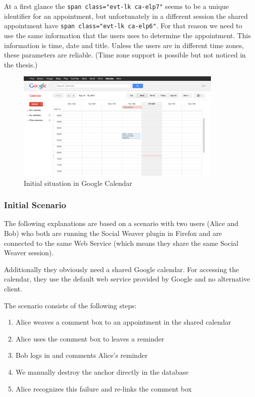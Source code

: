 At a first glance the \verb+span class="evt-lk ca-elp7"+ seems to be a unique identifier for an appointment, but unfortunately in a different session the shared appointment have \verb+span class="evt-lk ca-elp6"+. For that reason we need to use the same information that the users uses to determine the appointment. This information is time, date and title. Unless the users are in different time zones, these parameters are reliable. (Time zone support is possible but not noticed in the thesis.)

\begin{figure}\centering
	\includegraphics[width=10cm]{images/gcal-plain.png}
\caption{Initial situation in Google Calendar}
\label{gcal-plain}
\end{figure}

\subsubsection{Initial Scenario}
The following explanations are based on a scenario with two users (Alice and Bob) who both are running the Social Weaver plugin in Firefox and are connected to the same Web Service (which means they share the same Social Weaver session). 

Additionally they obviously need a shared Google calendar. For accessing the calendar, they use the default web service provided by Google and no alternative client. 

The scenario consists of the following steps:
\begin{enumerate}
	\item Alice weaves a comment box to an appointment in the shared calendar
	\item Alice uses the comment box to leaves a reminder
	\item Bob logs in and comments Alice's reminder 
	\item We manually destroy the anchor directly in the database
	\item Alice recognizes this failure and re-links the comment box
\end{enumerate}


